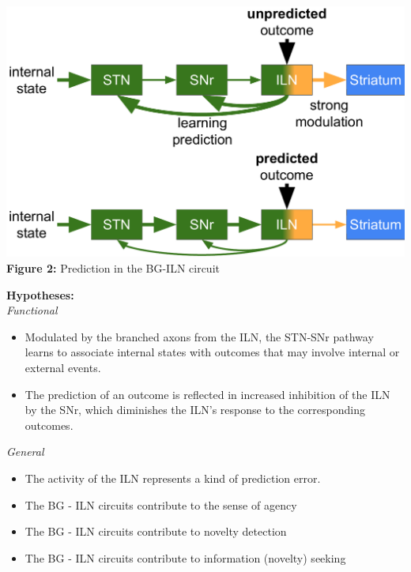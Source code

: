 \documentclass[portrait,final,a0paper,fontscale=0.30]{baposter}
\begin{document}
\begin{poster}
{\begin{adjustbox}{minipage=\textwidth, margin=2pt, center}
\begin{minipage}{0.25\textwidth}
        \includegraphics[width=\textwidth]{figures/circuit_idea_2.pdf}
        \textbf{Figure 2:} Prediction in the BG-ILN circuit
    \end{minipage}
    \hspace{0.01\textwidth}
    \begin{minipage}{0.18\textwidth}
        \textbf{Hypotheses:}\\
        \vfill
        \textit{Functional}
        \begin{itemize}
            \item Modulated by the branched axons from the ILN, the STN-SNr pathway learns to associate internal states with outcomes that may involve internal or external events.
            \item The prediction of an outcome is reflected in increased inhibition of the ILN by the SNr, which diminishes the ILN's response to the corresponding outcomes.
        \end{itemize}
        \vspace{5pt}
        
        \textit{General}
        \begin{itemize}
            \item The activity of the ILN represents a kind of prediction error.
            \item The BG - ILN circuits contribute to the sense of agency
            \item The BG - ILN circuits contribute to novelty detection
            \item The BG - ILN circuits contribute to information (novelty) seeking
        \end{itemize}        
    \end{minipage}
    \hfill


\end{adjustbox}}
\end{poster}
\end{document}

